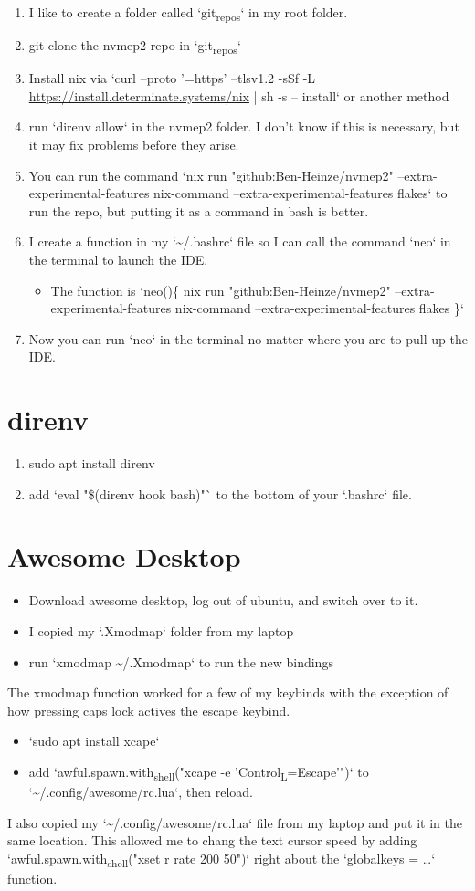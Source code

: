 \documentclass[11pt]{article}
\begin{document}
\begin{enumerate}
\item I like to create a folder called `git\textsubscript{repos}` in my root folder.
\item git clone the nvmep2 repo in `git\textsubscript{repos}`
\item Install nix via `curl --proto '=https' --tlsv1.2 -sSf -L \url{https://install.determinate.systems/nix} | sh -s -- install` or another method
\item run `direnv allow` in the nvmep2 folder. I don't know if this is necessary, but it may fix problems before they arise.
\item You can run the command `nix run "github:Ben-Heinze/nvmep2" --extra-experimental-features nix-command --extra-experimental-features flakes` to run the repo, but putting it as a command in bash is better.
\item I create a function in my `\textasciitilde{}/.bashrc` file so I can call the command `neo` in the terminal to launch the IDE.
\begin{itemize}
\item The function is `neo()\{ nix run "github:Ben-Heinze/nvmep2" --extra-experimental-features nix-command --extra-experimental-features flakes \}`
\end{itemize}
\item Now you can run `neo` in the terminal no matter where you are to pull up the IDE.
\end{enumerate}

\section{direnv}
\label{sec:org318b5e0}

\begin{enumerate}
\item sudo apt install direnv
\item add `eval "\$(direnv hook bash)"` to the bottom of your `.bashrc` file.
\end{enumerate}

\section{Awesome Desktop}
\label{sec:orgff1d571}

\begin{itemize}
\item Download awesome desktop, log out of ubuntu, and switch over to it.
\item I copied my `.Xmodmap` folder from my laptop
\item run `xmodmap \textasciitilde{}/.Xmodmap` to run the new bindings
\end{itemize}
The xmodmap function worked for a few of my keybinds with the exception of how pressing caps lock actives the escape keybind.
\begin{itemize}
\item `sudo apt install xcape`
\item add `awful.spawn.with\textsubscript{shell}("xcape -e 'Control\textsubscript{L}=Escape'")` to `\textasciitilde{}/.config/awesome/rc.lua`, then reload.
\end{itemize}

I also copied my `\textasciitilde{}/.config/awesome/rc.lua` file from my laptop and put it in the same location. This allowed me to chang the text cursor speed by adding `awful.spawn.with\textsubscript{shell}("xset r rate 200 50")` right about the `globalkeys = \ldots{}` function. 
\end{document}
